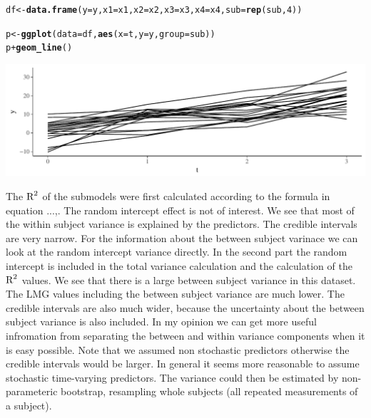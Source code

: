 \documentclass[11pt,a4paper,twoside]{book}\usepackage[]{graphicx}\usepackage[]{color}
\makeatletter
\newcommand{\hlnum}[1]{\textcolor[rgb]{0.686,0.059,0.569}{#1}}%
\newcommand{\hlopt}[1]{\textcolor[rgb]{0,0,0}{#1}}%
\newcommand{\hlstd}[1]{\textcolor[rgb]{0.345,0.345,0.345}{#1}}%
\newcommand{\hlkwb}[1]{\textcolor[rgb]{0.69,0.353,0.396}{#1}}%
\newcommand{\hlkwc}[1]{\textcolor[rgb]{0.333,0.667,0.333}{#1}}%
\newcommand{\hlkwd}[1]{\textcolor[rgb]{0.737,0.353,0.396}{\textbf{#1}}}%
\newenvironment{kframe}{%
 \def\at@end@of@kframe{}%
 \ifinner\ifhmode%
  \def\at@end@of@kframe{\end{minipage}}%
  \begin{minipage}{\columnwidth}%
 \fi\fi%
 \def\FrameCommand##1{\hskip\@totalleftmargin \hskip-\fboxsep
 \colorbox{shadecolor}{##1}\hskip-\fboxsep
     \hskip-\linewidth \hskip-\@totalleftmargin \hskip\columnwidth}%
 \MakeFramed {\advance\hsize-\width
   \@totalleftmargin\z@ \linewidth\hsize
   \@setminipage}}%
 {\par\unskip\endMakeFramed%
 \at@end@of@kframe}
\newenvironment{knitrout}{}{} %
\makeatother
\begin{document}
\begin{knitrout}
\begin{kframe}
\begin{alltt}
\hlstd{df} \hlkwb{<-} \hlkwd{data.frame}\hlstd{(}\hlkwc{y}\hlstd{=y,} \hlkwc{x1} \hlstd{= x1,} \hlkwc{x2}\hlstd{=x2,} \hlkwc{x3} \hlstd{= x3,} \hlkwc{x4} \hlstd{= x4,} \hlkwc{sub} \hlstd{=} \hlkwd{rep}\hlstd{(sub,}\hlnum{4}\hlstd{))}

\hlstd{p} \hlkwb{<-} \hlkwd{ggplot}\hlstd{(}\hlkwc{data} \hlstd{= df,} \hlkwd{aes}\hlstd{(}\hlkwc{x} \hlstd{= t,} \hlkwc{y} \hlstd{= y,} \hlkwc{group} \hlstd{= sub))}
\hlstd{p} \hlopt{+} \hlkwd{geom_line}\hlstd{()}
\end{alltt}
\end{kframe}

{\centering \includegraphics[width=\textwidth-3cm]{figure/ch04_figsimdata_repeated-1} 

}



\end{knitrout}


The $\text{R}^2$ of the submodels were first calculated according to the formula in equation ...,. The random intercept effect is not of interest. We see that most of the within subject variance is explained by the predictors. The credible intervals are very narrow. For the information about the between subject varinace we can look at the random intercept variance directly. In the second part the random intercept is included in the total variance calculation and the calculation of the $\text{R}^2$ values. We see that there is a large between subject variance in this dataset. The LMG values including the between subject variance are much lower. The credible intervals are also much wider, because the uncertainty about the between subject variance is also included. In my opinion we can get more useful infromation from separating the between and within variance components when it is easy possible. Note that we assumed non stochastic predictors otherwise the credible intervals would be larger. In general it seems more reasonable to assume stochastic time-varying predictors. The variance could then be estimated by non-parameteric bootstrap, resampling whole subjects (all repeated measurements of a subject).
\end{document}
